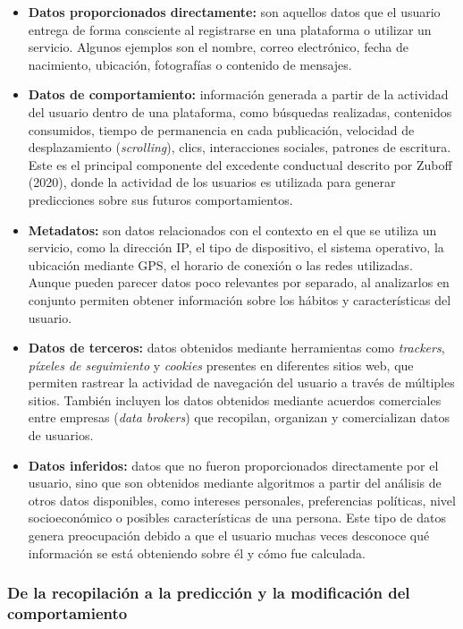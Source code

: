 \documentclass[11pt,a4paper]{article}
\begin{document}
\begin{itemize}
    \item \textbf{Datos proporcionados directamente:} son aquellos datos que el usuario entrega de forma consciente al registrarse en una plataforma o utilizar un servicio. Algunos ejemplos son el nombre, correo electrónico, fecha de nacimiento, ubicación, fotografías o contenido de mensajes.
    \item \textbf{Datos de comportamiento:} información generada a partir de la actividad del usuario dentro de una plataforma, como búsquedas realizadas, contenidos consumidos, tiempo de permanencia en cada publicación, velocidad de desplazamiento (\textit{scrolling}), clics, interacciones sociales, patrones de escritura. Este es el principal componente del excedente conductual descrito por Zuboff (2020), donde la actividad de los usuarios es utilizada para generar predicciones sobre sus futuros comportamientos.
    \item \textbf{Metadatos:} son datos relacionados con el contexto en el que se utiliza un servicio, como la dirección IP, el tipo de dispositivo, el sistema operativo, la ubicación mediante GPS, el horario de conexión o las redes utilizadas. Aunque pueden parecer datos poco relevantes por separado, al analizarlos en conjunto permiten obtener información sobre los hábitos y características del usuario.
    \item \textbf{Datos de terceros:} datos obtenidos mediante herramientas como \textit{trackers}, \textit{píxeles de seguimiento} y \textit{cookies} presentes en diferentes sitios web, que permiten rastrear la actividad de navegación del usuario a través de múltiples sitios. También incluyen los datos obtenidos mediante acuerdos comerciales entre empresas (\textit{data brokers}) que recopilan, organizan y comercializan datos de usuarios.
    \item \textbf{Datos inferidos:} datos que no fueron proporcionados directamente por el usuario, sino que son obtenidos mediante algoritmos a partir del análisis de otros datos disponibles, como intereses personales, preferencias políticas, nivel socioeconómico o posibles características de una persona. Este tipo de datos genera preocupación debido a que el usuario muchas veces desconoce qué información se está obteniendo sobre él y cómo fue calculada.
\end{itemize}

\subsubsection{De la recopilación a la predicción y la modificación del comportamiento}
\end{document}
